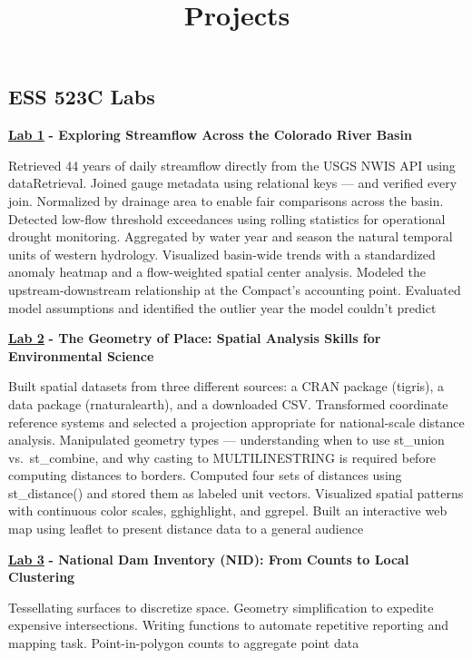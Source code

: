 \documentclass[
  letterpaper,
  DIV=11,
  numbers=noendperiod]{scrartcl}
\title{Projects}
\author{}
\date{}
\begin{document}
\maketitle


\label{hero-heading}
\subsection{ESS 523C Labs}\label{ess-523c-labs}

\href{https://mrouin.github.io/csu-523c/lab-01-clean.html}{\textbf{Lab
1}} \textbf{- Exploring Streamflow Across the Colorado River Basin}

Retrieved 44 years of daily streamflow directly from the USGS NWIS API
using dataRetrieval. Joined gauge metadata using relational keys --- and
verified every join. Normalized by drainage area to enable fair
comparisons across the basin. Detected low-flow threshold exceedances
using rolling statistics for operational drought monitoring. Aggregated
by water year and season the natural temporal units of western
hydrology. Visualized basin-wide trends with a standardized anomaly
heatmap and a flow-weighted spatial center analysis. Modeled the
upstream-downstream relationship at the Compact's accounting point.
Evaluated model assumptions and identified the outlier year the model
couldn't predict

\href{https://mrouin.github.io/csu-523c/lab-02-clean.html}{\textbf{Lab
2}} \textbf{- The Geometry of Place: Spatial Analysis Skills for
Environmental Science}

Built spatial datasets from three different sources: a CRAN package
(tigris), a data package (rnaturalearth), and a downloaded CSV.
Transformed coordinate reference systems and selected a projection
appropriate for national-scale distance analysis. Manipulated geometry
types --- understanding when to use st\_union vs.~st\_combine, and why
casting to MULTILINESTRING is required before computing distances to
borders. Computed four sets of distances using st\_distance() and stored
them as labeled unit vectors. Visualized spatial patterns with
continuous color scales, gghighlight, and ggrepel. Built an interactive
web map using leaflet to present distance data to a general audience

\href{https://mrouin.github.io/csu-523c/lab-03-clean.html}{\textbf{Lab
3}} \textbf{- National Dam Inventory (NID): From Counts to Local
Clustering}

Tessellating surfaces to discretize space. Geometry simplification to
expedite expensive intersections. Writing functions to automate
repetitive reporting and mapping task. Point-in-polygon counts to
aggregate point data
\end{document}
